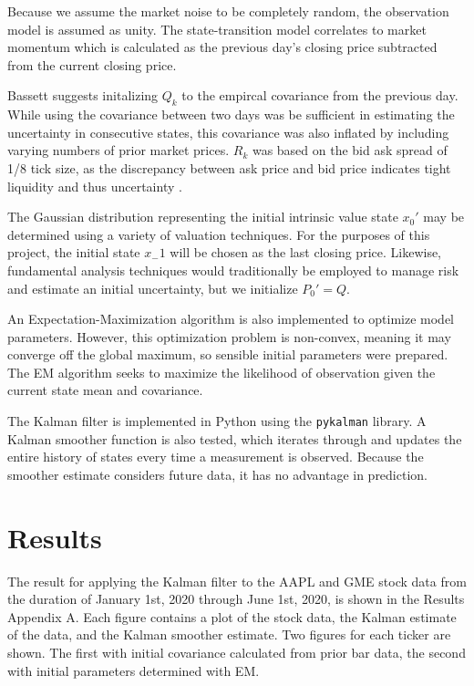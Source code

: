 \documentclass[12pt, letterpaper]{article}
\newcommand{\code}[1]{\texttt{#1}}
\begin{document}
Because we assume the market noise to be completely random, the observation model is assumed as unity. The state-transition model correlates to market momentum which is calculated as the previous day's closing price subtracted from the current closing price.

Bassett \cite{bassett} suggests initalizing $Q_k$ to the empircal covariance from the previous day. While using the covariance between two days was be sufficient in estimating the uncertainty in consecutive states, this covariance was also inflated by including varying numbers of prior market prices.  $R_k$ was based on the bid ask spread of 1/8 tick size, as the discrepancy between ask price and bid price indicates tight liquidity and thus uncertainty \cite{labbe}.

The Gaussian distribution representing the initial intrinsic value state $x_0'$ may be determined using a variety of valuation techniques. For the purposes of this project, the initial state $x_-1$ will be chosen as the last closing price. Likewise, fundamental analysis techniques would traditionally be employed to manage risk and estimate an initial uncertainty, but we initialize $P_0' = Q$. 

An Expectation-Maximization algorithm is also implemented to optimize model parameters. However, this optimization problem is non-convex, meaning it may converge off the global maximum, so sensible initial parameters were prepared. The EM algorithm seeks to maximize the likelihood of observation given the current state mean and covariance.

The Kalman filter is implemented in Python using the \code{pykalman} library\cite{duckworth}. A Kalman smoother function is also tested, which iterates through and updates the entire history of states every time a measurement is observed. Because the smoother estimate considers future data, it has no advantage in prediction.

\section{Results}
The result for applying the Kalman filter to the AAPL and GME stock data from the duration of January 1st, 2020 through June 1st, 2020, is shown in the Results Appendix A. Each figure contains a plot of the stock data, the Kalman estimate of the data, and the Kalman smoother estimate. Two figures for each ticker are shown. The first with initial covariance calculated from prior bar data, the second with initial parameters determined with EM.
\end{document}
